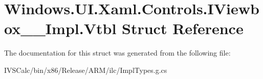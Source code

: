 \hypertarget{struct_windows_1_1_u_i_1_1_xaml_1_1_controls_1_1_i_viewbox_____impl_1_1_vtbl}{}\section{Windows.\+U\+I.\+Xaml.\+Controls.\+I\+Viewbox\+\_\+\+\_\+\+Impl.\+Vtbl Struct Reference}
\label{struct_windows_1_1_u_i_1_1_xaml_1_1_controls_1_1_i_viewbox_____impl_1_1_vtbl}


The documentation for this struct was generated from the following file\+:\begin{DoxyCompactItemize}
\item 
I\+V\+S\+Calc/bin/x86/\+Release/\+A\+R\+M/ilc/Impl\+Types.\+g.\+cs\end{DoxyCompactItemize}
